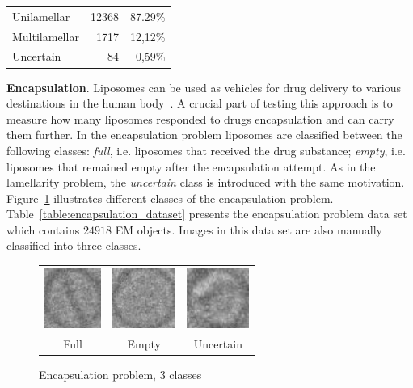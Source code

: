 \documentclass[a4paper, 11pt, table]{article}
\begin{document}
\begin{center}
\label{table:lamellarity_data_set}
\begin{tabular}{lrr}
\toprule
Unilamellar & \num{12368} & 87.29\% \\ 
Multilamellar & \num{1717} & 12,12\% \\ 
Uncertain & \num{84} & 0,59\% \\ 
\end{tabular} 
\end{center}


\textbf{Encapsulation}. Liposomes can be used as vehicles for drug delivery to various destinations in the human body~\cite{betageri1993liposome}. A crucial part of testing this approach is to measure how many liposomes responded to drugs encapsulation and can carry them further. In the encapsulation problem liposomes are classified between the following classes: \textit{full}, i.e. liposomes that received the drug substance; \textit{empty}, i.e. liposomes that remained empty after the encapsulation attempt. As in the lamellarity problem, the \textit{uncertain} class is introduced with the same motivation. Figure~\ref{fig:encapsulation_problem} illustrates different classes of the encapsulation problem. Table~\ref{table:encapsulation_dataset} presents the encapsulation problem data set which contains $\num{24918}$ EM objects. Images in this data set are also manually classified into three classes.

\begin{figure}[H]
\centering
\begin{tabular}{ccc}
	\includegraphics[height=2cm, keepaspectratio]{problem_description/packiging/full} & \includegraphics[height=2cm, keepaspectratio]{problem_description/packiging/empty} & \includegraphics[height=2cm, keepaspectratio]{problem_description/packiging/uncertain} \\
	Full & Empty & Uncertain \\[6pt]
\end{tabular}
\caption{Encapsulation problem, 3 classes}
\label{fig:encapsulation_problem}
\end{figure}
\end{document}
